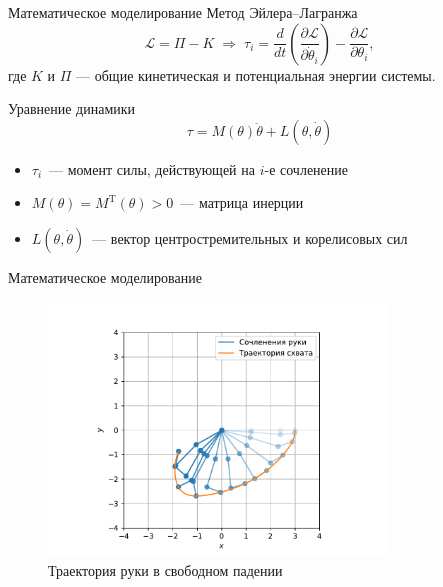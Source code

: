 \documentclass[16pt]{beamer}
\begin{document}
    \begin{frame}{Математическое моделирование}
        Метод Эйлера--Лагранжа
        $$
            \mathcal{L} = \Pi - K
            \;\Longrightarrow\;
            \tau_i
            =
              \frac{d}{dt}\left(\frac{\partial \mathcal{L}}{\partial \dot \theta_i}\right)
            - \frac{\partial \mathcal{L}}{\partial \theta_i},
        $$
        где $K$ и $\Pi$ --- общие кинетическая и потенциальная энергии системы.
        \vfill
        \begin{block}{Уравнение динамики}
            $$
                \tau = M(\theta)\ddot\theta + L(\theta, \dot\theta)
            $$
            \begin{itemize}
                \item $\tau_i$~--- момент силы, действующей на $i$-е сочленение
                \item $M(\theta)=M^{\mathrm{T}}(\theta)>0$~--- матрица инерции
                \item $L(\theta, \dot\theta)$~--- вектор центростремительных и корелисовых сил
            \end{itemize}
        \end{block}
    \end{frame}

    \begin{frame}{Математическое моделирование}
        \begin{figure}
            \includegraphics[width=0.8\textwidth]{img/discrete_pendulum.pdf}
            \caption{Траектория руки в свободном падении}
        \end{figure}
    \end{frame}
\end{document}

